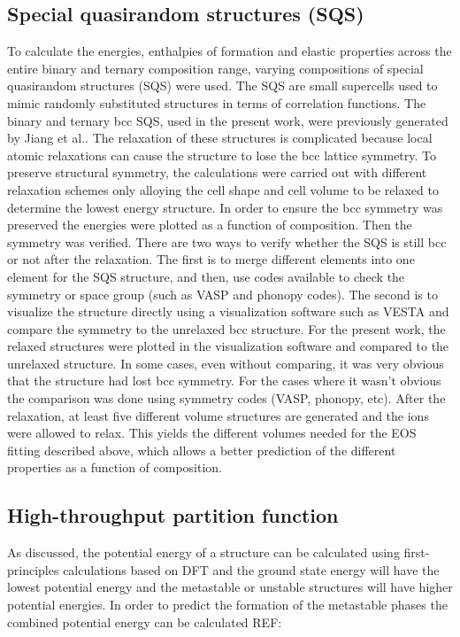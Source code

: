 \subsection{Special quasirandom structures (SQS)}

To calculate the energies, enthalpies of formation and elastic properties across the entire binary and ternary composition range, varying compositions of special quasirandom structures (SQS) were used. The SQS are small supercells used to mimic randomly substituted structures in terms of correlation functions. The binary and ternary bcc SQS, used in the present work, were previously generated by Jiang et al.\cite{Jiang2004,Jiang2009}. The relaxation of these structures is complicated because local atomic relaxations can cause the structure to lose the bcc lattice symmetry. To preserve structural symmetry, the calculations were carried out with different relaxation schemes only alloying the cell shape and cell volume to be relaxed to determine the lowest energy structure. In order to ensure the bcc symmetry was preserved the energies were plotted as a function of composition. Then the symmetry was verified. There are two ways to verify whether the SQS is still bcc or not after the relaxation. The first is to merge different elements into one element for the SQS structure, and then, use codes available to check the symmetry or space group (such as VASP and phonopy codes). The second is to visualize the structure directly using a visualization software such as VESTA and compare the symmetry to the unrelaxed bcc structure. For the present work, the relaxed structures were plotted in the visualization software and compared to the unrelaxed structure. In some cases, even without comparing, it was very obvious that the structure had lost bcc symmetry. For the cases where it wasn't obvious the comparison was done using symmetry codes (VASP, phonopy, etc). After the relaxation, at least five different volume structures are generated and the ions were allowed to relax. This yields the different volumes needed for the EOS fitting described above, which allows a better prediction of the different properties as a function of composition. 

\subsection{High-throughput partition function}

As discussed, the potential energy of a structure can be calculated using first-principles calculations based on DFT and the ground state energy will have the lowest potential energy and the metastable or unstable structures will have higher potential energies. In order to predict the formation of the metastable phases the combined potential energy can be calculated REF:

